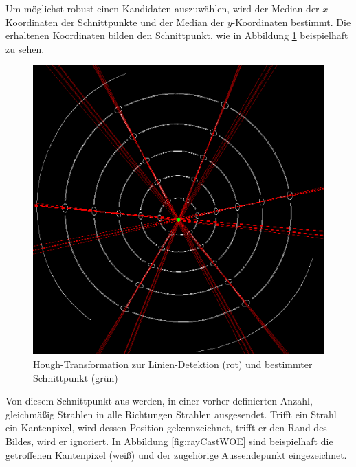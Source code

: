 Um möglichst robust einen Kandidaten auszuwählen, wird der Median der $x$-Koordinaten der Schnittpunkte und der Median der $y$-Koordinaten bestimmt. Die erhaltenen Koordinaten bilden den Schnittpunkt, wie in Abbildung \ref{fig:houghLines} beispielhaft zu sehen.

\begin{figure}[!htb]
	\centering
	\includegraphics[scale=.25]{images/houghLines.png}
	\caption[Hough-Transformation zur Linien-Detektion und bestimmter Schnittpunkt]{Hough-Transformation zur Linien-Detektion (rot) und bestimmter Schnittpunkt (grün) }
	\label{fig:houghLines}
\end{figure}

Von diesem Schnittpunkt aus werden, in einer vorher definierten Anzahl, gleichmäßig Strahlen in alle Richtungen Strahlen ausgesendet.
Trifft ein Strahl ein Kantenpixel, wird dessen Position gekennzeichnet, trifft er den Rand des Bildes, wird er ignoriert. In Abbildung \ref{fig:rayCastWOE} sind beispielhaft die getroffenen Kantenpixel (weiß) und der zugehörige Aussendepunkt eingezeichnet.


